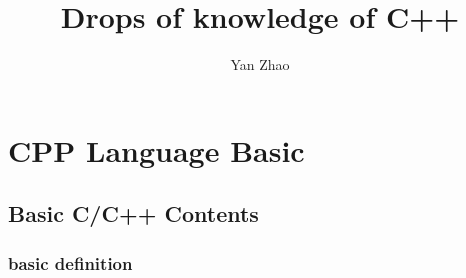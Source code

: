 \documentclass[a4paper,12pt,twoside]{book}
\begin{document}
\title{Drops of knowledge of C++}
\author{Yan Zhao}
\date{}\maketitle

\setcounter{secnumdepth}{4}
\setcounter{tocdepth}{4}
\tableofcontents
\chapter{CPP Language Basic}

\section{Basic C/C++ Contents}
\subsection{basic definition}
\end{document}
